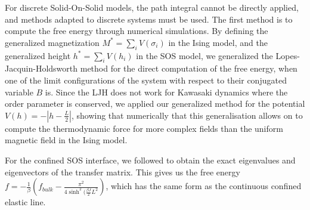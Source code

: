 For discrete  Solid-On-Solid models, the path integral cannot be directly applied, and methods adapted to discrete systems must be used. The first method is to compute the free energy through numerical simulations. By defining the generalized magnetization $M^\ast = \sum_i V(\sigma_i)$ in the Ising model, and the generalized height $h^\ast = \sum_i V(h_i)$ in the SOS model, we generalized the Lopes-Jacquin-Holdsworth method \cite{lopes_cardozo_critical_2014} for the direct computation of the free energy, when one of the limit configurations of the system with respect to their conjugated variable $B$ is. Since the LJH does not work for Kawasaki dynamics where the order parameter is conserved, we applied our generalized method for the potential $V(h) = - | h - \frac{L}{2}|$, showing that numerically that this generalisation allows on to  compute the thermodynamic force for more complex fields than the uniform magnetic field in the Ising model.

For the confined SOS interface, we followed \cite{svrakic_finite-size_1988} to obtain the exact eigenvalues and eigenvectors of the transfer matrix. This gives us the free energy $f = -\frac{1}{\beta} \left( f_{bulk} - \frac{\pi^2}{4 \sinh^2(\frac{\beta J}{2} L^2 } \right)$, which has the same form as the continuous confined elastic line. 
